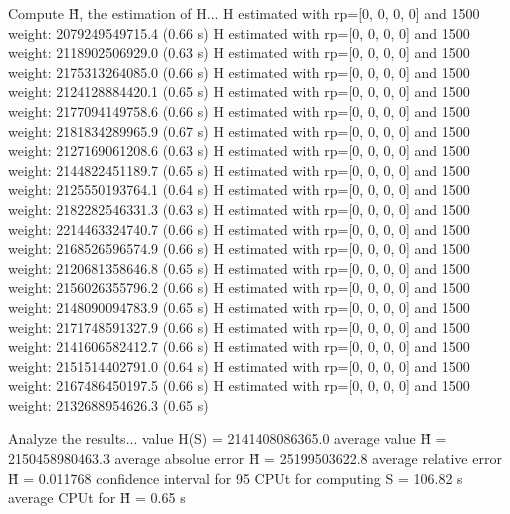 Compute H̃, the estimation of H...
  H estimated with rp=[0, 0, 0, 0] and 1500 weight:  2079249549715.4  (0.66 s)
  H estimated with rp=[0, 0, 0, 0] and 1500 weight:  2118902506929.0  (0.63 s)
  H estimated with rp=[0, 0, 0, 0] and 1500 weight:  2175313264085.0  (0.66 s)
  H estimated with rp=[0, 0, 0, 0] and 1500 weight:  2124128884420.1  (0.65 s)
  H estimated with rp=[0, 0, 0, 0] and 1500 weight:  2177094149758.6  (0.66 s)
  H estimated with rp=[0, 0, 0, 0] and 1500 weight:  2181834289965.9  (0.67 s)
  H estimated with rp=[0, 0, 0, 0] and 1500 weight:  2127169061208.6  (0.63 s)
  H estimated with rp=[0, 0, 0, 0] and 1500 weight:  2144822451189.7  (0.65 s)
  H estimated with rp=[0, 0, 0, 0] and 1500 weight:  2125550193764.1  (0.64 s)
  H estimated with rp=[0, 0, 0, 0] and 1500 weight:  2182282546331.3  (0.63 s)
  H estimated with rp=[0, 0, 0, 0] and 1500 weight:  2214463324740.7  (0.66 s)
  H estimated with rp=[0, 0, 0, 0] and 1500 weight:  2168526596574.9  (0.66 s)
  H estimated with rp=[0, 0, 0, 0] and 1500 weight:  2120681358646.8  (0.65 s)
  H estimated with rp=[0, 0, 0, 0] and 1500 weight:  2156026355796.2  (0.66 s)
  H estimated with rp=[0, 0, 0, 0] and 1500 weight:  2148090094783.9  (0.65 s)
  H estimated with rp=[0, 0, 0, 0] and 1500 weight:  2171748591327.9  (0.66 s)
  H estimated with rp=[0, 0, 0, 0] and 1500 weight:  2141606582412.7  (0.66 s)
  H estimated with rp=[0, 0, 0, 0] and 1500 weight:  2151514402791.0  (0.64 s)
  H estimated with rp=[0, 0, 0, 0] and 1500 weight:  2167486450197.5  (0.66 s)
  H estimated with rp=[0, 0, 0, 0] and 1500 weight:  2132688954626.3  (0.65 s)

Analyze the results...
  value H(S)                  = 2141408086365.0 
  average value H̃             = 2150458980463.3 
  average absolue error H̃     = 25199503622.8 
  average relative error H̃    = 0.011768 
  confidence interval for 95%
  CPUt for computing S         = 106.82 s
  average CPUt for H̃           = 0.65 s

